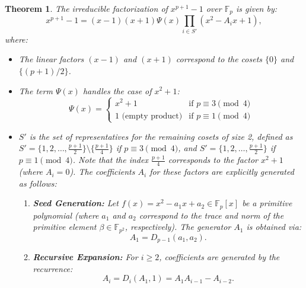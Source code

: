 \documentclass[12pt]{article}
\theoremstyle{plain}
\newtheorem{thm}{Theorem}[section]
\numberwithin{equation}{section}
\begin{document}
\begin{thm}\label{thm:base_factorization}
The irreducible factorization of $x^{p+1}-1$ over $\mathbb{F}_p$ is given by:
\begin{equation}
x^{p+1}-1 = (x-1)(x+1) \Psi(x) \prod_{i \in S'} (x^2 - A_i x + 1),
\end{equation}
where:
\begin{itemize}
    \item The linear factors $(x-1)$ and $(x+1)$ correspond to the cosets $\{0\}$ and $\{(p+1)/2\}$.
    \item The term $\Psi(x)$ handles the case of $x^2+1$:
    $$ \Psi(x) = \begin{cases} x^2+1 & \text{if } p \equiv 3 \pmod 4 \\ \text{1 (empty product)} & \text{if } p \equiv 1 \pmod 4 \end{cases} $$
    \item $S'$ is the set of representatives for the remaining cosets of size 2, defined as $S' = \{1, 2, \dots, \frac{p+1}{2}\} \setminus \{\frac{p+1}{4}\}$ if $p \equiv 3 \pmod 4$, and $S' = \{1, 2, \dots, \frac{p+1}{2}\}$ if $p \equiv 1 \pmod 4$. Note that the index $\frac{p+1}{4}$ corresponds to the factor $x^2+1$ (where $A_i=0$). The coefficients $A_i$ for these factors are explicitly generated as follows:
    \begin{enumerate}
        \item \textbf{Seed Generation:} Let $f(x) = x^2 - a_1 x + a_2 \in \mathbb{F}_p[x]$ be a primitive polynomial (where $a_1$ and $a_2$ correspond to the trace and norm of the primitive element $\beta \in \mathbb{F}_{p^2}$, respectively). The generator $A_1$ is obtained via:
        $$A_1 = D_{p-1}(a_1, a_2).$$
        \item \textbf{Recursive Expansion:} For $i \ge 2$, coefficients are generated by the recurrence:
        $$A_i = D_i(A_1, 1) = A_1 A_{i-1} - A_{i-2}.$$
    \end{enumerate}
\end{itemize}
\end{thm}
\end{document}
